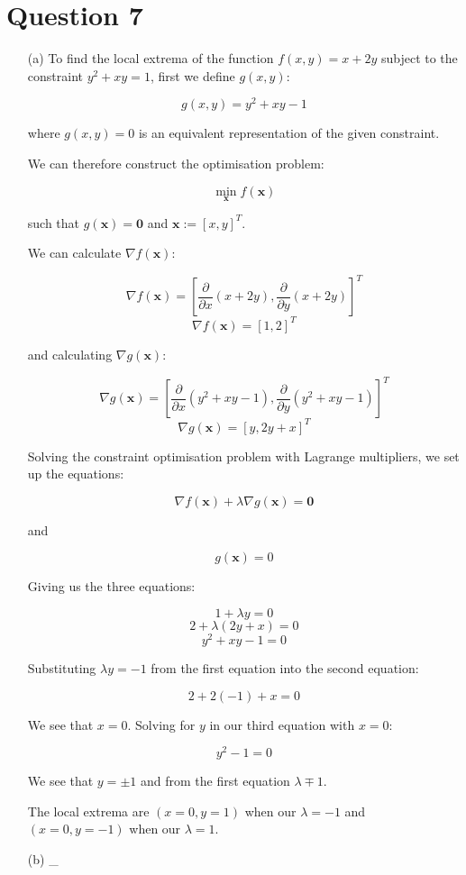 \documentclass[12pt]{article}
\begin{document}
\section*{Question 7}
\begin{enumerate}
\item[(a)] To find the local extrema of the function $f(x,y) = x + 2y$ subject to the constraint $y^2 + xy = 1$, first we define $g(x, y)$:

$$g(x, y) = y^2 + xy - 1$$

where $g(x, y)=0$ is an equivalent representation of the given constraint.

We can therefore construct the optimisation problem:

$$\min_{\textbf{x}} f(\textbf{x})$$

such that $g(\textbf{x})=\textbf{0}$ and $\textbf{x} := [x, y]^T$.

We can calculate $\nabla f(\textbf{x})$:

$$\nabla f(\textbf{x}) = [\frac{\partial}{\partial x} (x+2y), \frac{\partial}{\partial y} (x+2y)]^T$$
$$\nabla f(\textbf{x}) = [1, 2]^T$$

and calculating $\nabla g(\textbf{x})$:

$$\nabla g(\textbf{x}) = [\frac{\partial}{\partial x} (y^2 + xy - 1), \frac{\partial}{\partial y} (y^2 + xy - 1)]^T$$
$$\nabla g(\textbf{x}) = [y, 2y+x]^T$$

Solving the constraint optimisation problem with Lagrange multipliers, we set up the equations:

$$\nabla f(\textbf{x})+\lambda \nabla g(\textbf{x}) = \textbf{0}$$

and

$$g(\textbf{x}) = 0$$

Giving us the three equations:

$$1+\lambda y = 0$$
$$2+\lambda (2y+x)= 0$$
$$y^2 + xy - 1 = 0$$

Substituting $\lambda y = -1$ from the first equation into the second equation:

$$2+2(-1) + x = 0$$

We see that $x=0$.
Solving for $y$ in our third equation with $x=0$:

$$y^2-1=0$$

We see that $y=\pm 1$ and from the first equation $\lambda\mp 1$.

The local extrema are $(x=0, y=1)$ when our $\lambda=-1$ and $(x=0, y=-1)$ when our $\lambda=1$.

\item[(b)] _




\end{enumerate}
\end{document}
